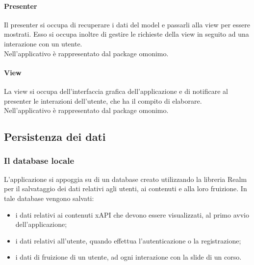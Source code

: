 \documentclass[../Tesi.tex]{subfiles}
\begin{document}
		\paragraph*{Presenter}
		Il presenter si occupa di recuperare i dati del model e passarli alla view per essere mostrati. Esso si occupa inoltre di gestire le richieste della view in seguito ad una interazione con un utente. \\ Nell'applicativo è rappresentato dal package omonimo.

		\paragraph*{View}
		La view si occupa dell'interfaccia grafica dell'applicazione e di notificare al presenter le interazioni dell'utente, che ha il compito di elaborare. \\ Nell'applicativo è rappresentato dal package omonimo.
	
	\subsection{Persistenza dei dati}
		\subsubsection{Il database locale}
		L'applicazione si appoggia su di un database creato utilizzando la libreria Realm per il salvataggio dei dati relativi agli utenti, ai contenuti e alla loro fruizione. In tale database vengono salvati:
		\begin{itemize}
			\item i dati relativi ai contenuti xAPI che devono essere visualizzati, al primo avvio dell'applicazione;
			\item i dati relativi all'utente, quando effettua l'autenticazione o la registrazione;
			\item i dati di fruizione di un utente, ad ogni interazione con la slide di un corso.
		\end{itemize}
			
\end{document}
